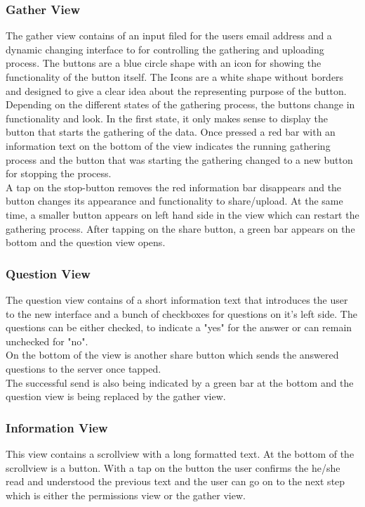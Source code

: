 \subsubsection{Gather View}
The gather view contains of an input filed for the users email address and a dynamic changing interface to for controlling the gathering and uploading process. The buttons are a blue circle shape with an icon for showing the functionality of the button itself. The Icons are a white shape without borders and designed to give a clear idea about the representing purpose of the button. 
Depending on the different states of the gathering process, the buttons change in functionality and look. In the first state, it only makes sense to display the button that starts the gathering of the data. Once pressed a red bar with an information text on the bottom of the view indicates the running gathering process and the button that was starting the gathering changed to a new button for stopping the process.\\
A tap on the stop-button removes the red information bar disappears and the button changes its appearance and functionality to share/upload.
At the same time, a smaller button appears on left hand side in the view which can restart the gathering process. 
After tapping on the share button, a green bar appears on the bottom and the question view opens. 

\subsubsection{Question View}
The question view contains of a short information text that introduces the user to the new interface and a bunch of checkboxes for questions on it's left side. 
The questions can be either checked, to indicate a "yes" for the answer or can remain unchecked for "no".\\
On the bottom of the view is another share button which sends the answered questions to the server once tapped.\\
The successful send is also being indicated by a green bar at the bottom and the question view is being replaced by the gather view. 

\subsubsection{Information View}
This view contains a scrollview with a long formatted text. At the bottom of the scrollview is a button. With a tap on the button the user confirms the he/she read and understood the previous text and the user can go on to the next step which is either the permissions view or the gather view. 

